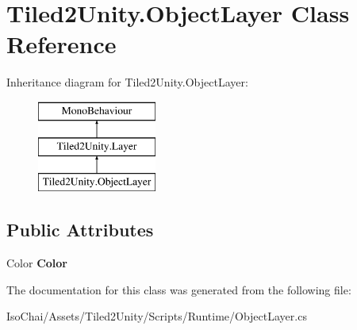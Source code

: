 \hypertarget{class_tiled2_unity_1_1_object_layer}{}\section{Tiled2\+Unity.\+Object\+Layer Class Reference}
\label{class_tiled2_unity_1_1_object_layer}
Inheritance diagram for Tiled2\+Unity.\+Object\+Layer\+:\begin{figure}[H]
\begin{center}
\leavevmode
\includegraphics[height=3.000000cm]{class_tiled2_unity_1_1_object_layer}
\end{center}
\end{figure}
\subsection*{Public Attributes}
\begin{DoxyCompactItemize}
\item 
\mbox{\label{class_tiled2_unity_1_1_object_layer_a4089059fb20eea72f30158d311868e54}} 
Color {\bfseries Color}
\end{DoxyCompactItemize}


The documentation for this class was generated from the following file\+:\begin{DoxyCompactItemize}
\item 
Iso\+Chai/\+Assets/\+Tiled2\+Unity/\+Scripts/\+Runtime/Object\+Layer.\+cs\end{DoxyCompactItemize}
